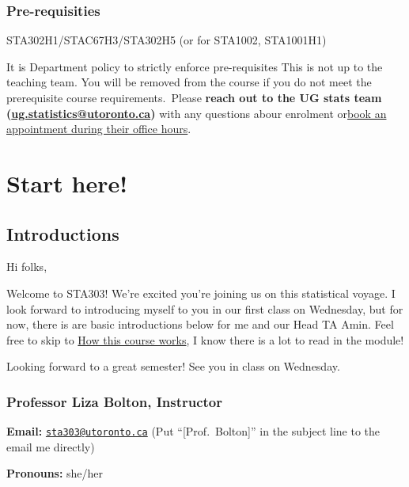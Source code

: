 \documentclass[
]{book}
\begin{document}
\hypertarget{pre-requisities}{%
\subsection{Pre-requisities}\label{pre-requisities}}

STA302H1/STAC67H3/STA302H5 (or for STA1002, STA1001H1)

It is Department policy to strictly enforce pre-requisites This is not up to the teaching team. You will be removed from the course if you do not meet the prerequisite course requirements.~Please \textbf{reach out to the UG stats team (\url{ug.statistics@utoronto.ca})} with any questions abour enrolment or\href{https://outlook.office365.com/owa/calendar/DepartmentofStatisticalSciencesUndergraduate@utoronto.onmicrosoft.com/bookings/}{book an appointment during their office hours}.

\hypertarget{start-here}{%
\chapter{Start here!}\label{start-here}}

\hypertarget{introductions}{%
\section{Introductions}\label{introductions}}

Hi folks,

Welcome to STA303! We're excited you're joining us on this statistical voyage. I look forward to introducing myself to you in our first class on Wednesday, but for now, there is are basic introductions below for me and our Head TA Amin. Feel free to skip to \protect\hyperlink{howthiscourseworks}{How this course works}, I know there is a lot to read in the module!

Looking forward to a great semester! See you in class on Wednesday.

\hypertarget{professor-liza-bolton-instructor}{%
\subsection{Professor Liza Bolton, Instructor}\label{professor-liza-bolton-instructor}}

\textbf{Email:} \href{mailto:sta303@utoronto.ca}{\nolinkurl{sta303@utoronto.ca}} (Put ``{[}Prof.~Bolton{]}'' in the subject line to the email me directly)

\textbf{Pronouns:} she/her
\end{document}
